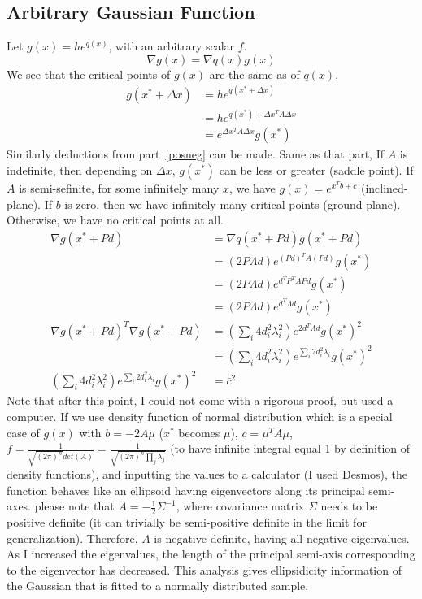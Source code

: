 \documentclass{book}
\numberwithin{equation}{subsection}
\begin{document}
\subsection{Arbitrary Gaussian Function}
Let $g(x) = he^{q(x)}$, with an arbitrary scalar $f$.
\begin{equation}
    \nabla g(x) = \nabla q(x) g(x)
\end{equation}
We see that the critical points of $g(x)$ are the same as of $q(x)$.
\begin{align}
    g(x^*+\Delta x) &= he^{q(x^*+\Delta x)}\\
     &= he^{q(x^*) + \Delta x^TA\Delta x}\\
     &= e^{\Delta x^TA\Delta x}g(x^*)
\end{align}
Similarly deductions from part~\ref{posneg} can be made. Same as that part, If $A$ is indefinite, then depending on $\Delta x$, $g(x^*)$ can be less or greater (saddle point). If $A$ is semi-sefinite, for some infinitely many $x$, we have $g(x) = e^{x^Tb+c}$ (inclined-plane). If $b$ is zero, then we have infinitely many critical points (ground-plane). Otherwise, we have no critical points at all.
\begin{align}
    \nabla g(x^*+Pd) &= \nabla q(x^*+Pd) g(x^*+Pd)\\
    &= (2P\Lambda d) e^{(Pd)^TA(Pd)}g(x^*)\\
    &= (2P\Lambda d) e^{d^TP^TAPd}g(x^*)\\
    &= (2P\Lambda d) e^{d^T\Lambda d}g(x^*)\\
    \nabla g(x^*+Pd)^T \nabla g(x^*+Pd) &= (\sum_i 4d_i^2\lambda_i^2)e^{2d^T\Lambda d}g(x^*)^2\\
    &= (\sum_i 4d_i^2\lambda_i^2)e^{\sum_i 2d_i^2\lambda_i}g(x^*)^2\\
    (\sum_i 4d_i^2\lambda_i^2)e^{\sum_i 2d_i^2\lambda_i}g(x^*)^2 &= \bar{c}^2
\end{align}
Note that after this point, I could not come with a rigorous proof, but used a computer.
If we use density function of normal distribution which is a special case of $g(x)$ with $b=-2A\mu$ ($x^*$ becomes $\mu$), $c=\mu^TA\mu$, $f = \frac{1}{\sqrt{(2\pi)^n}det(A)} = \frac{1}{\sqrt{(2\pi)^n\prod_j \lambda_j}}$ (to have infinite integral equal 1 by definition of density functions), and inputting the values to a calculator (I used Desmos), the function behaves like an ellipsoid having eigenvectors along its principal semi-axes. please note that $A=-\frac{1}{2}\Sigma^{-1}$, where covariance matrix $\Sigma$ needs to be positive definite (it can trivially be semi-positive definite in the limit for generalization). Therefore, $A$ is negative definite, having all negative eigenvalues. As I increased the eigenvalues, the length of the principal semi-axis corresponding to the eigenvector has decreased.
This analysis gives ellipsidicity information of the Gaussian that is fitted to a normally distributed sample.
\end{document}
